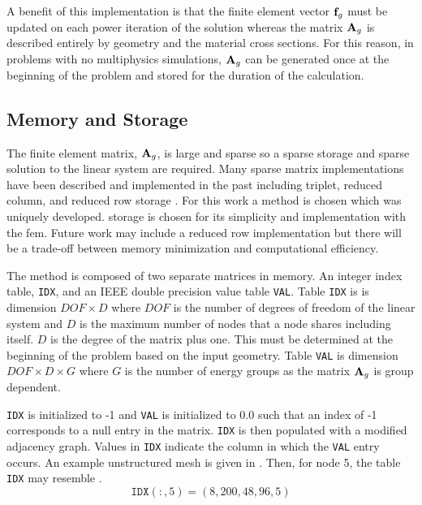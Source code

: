     A benefit of this implementation is that the finite element vector $\mathbf{f}_g$
    must be updated on each power iteration of the solution whereas the matrix
    $\mathbf{A}_g$ is described entirely by geometry and the material cross sections.
    For this reason, in problems with no multiphysics simulations, $\mathbf{A}_g$ can
    be generated once at the beginning of the problem and stored for the
    duration of the calculation.

    \FloatBarrier %

  \subsection{Memory and Storage}
    The finite element matrix, $\mathbf{A}_g$, is large and sparse so a sparse storage 
    and sparse solution to the linear system are required. Many sparse matrix 
    implementations have been described and implemented in the past including
    triplet, reduced column, and reduced row storage \cite{sparseBLAS}.  For 
    this work a \twotable method is chosen which was uniquely developed. 
    \twotable storage is chosen for its simplicity and implementation with the 
    \gls{fem}. Future work may include a reduced row implementation but there 
    will be a trade-off between memory minimization and computational 
    efficiency.
    
    The \twotable method is composed of two separate matrices in memory. An
    integer index table, \texttt{IDX}, and an IEEE double precision value table
    \texttt{VAL}. Table \texttt{IDX} is is dimension $DOF \times D$ where $DOF$
    is the number of degrees of freedom of the linear system and $D$ is the
    maximum number of nodes that a node shares including itself. $D$ is the
    degree of the matrix plus one. This must be determined at the beginning of
    the problem based on the input geometry.  Table \texttt{VAL} is dimension
    $DOF \times D \times G$ where $G$ is the number of energy groups as the
    matrix $\mathbf{A}_g$ is group dependent.
    
    \texttt{IDX} is initialized to -1 and \texttt{VAL} is initialized 
    to 0.0 such that an index of -1 corresponds to a null entry in the 
    matrix. \texttt{IDX} is then populated with a modified adjacency graph. 
    Values in \texttt{IDX} indicate the column in which the \texttt{VAL} entry
    occurs. An example unstructured mesh is given in . 
    Then, for node 5, the table \texttt{IDX} may resemble .
    \begin{equation}
      \label{eq:idx_example}
      \texttt{IDX}(:,5) = (8, 200, 48, 96, 5 )
    \end{equation}

